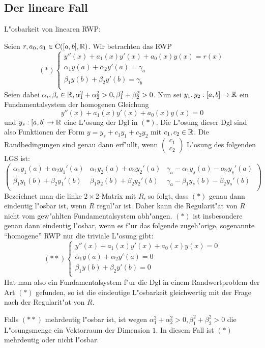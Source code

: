 \subsection{Der lineare Fall}
\deduction L"osbarkeit von linearen RWP:{
  Seien $r,a_0,a_1\in{\rm C}([a,b],\mathbb R)$. Wir betrachten das RWP
  \[(*)\left\{\begin{array}{l}
      y''(x)+a_1(x)y'(x)+a_0(x)y(x)=r(x)\\
      \alpha_1y(a)+\alpha_2y'(a)=\gamma_a\\
      \beta_1y(b)+\beta_2y'(b)=\gamma_b\\      
    \end{array}\right.
    \]
  Seien dabei $\alpha_i,\beta_i\in\mathbb R,\alpha_1^2+\alpha_2^2>0,
  \beta_1^2+\beta_2^2>0$. Nun sei $y_1,y_2:[a,b]\to\mathbb R$ ein 
  Fundamentalsystem der homogenen Gleichung
  \[y''(x)+a_1(x)y'(x)+a_0(x)y(x)=0
    \]
  und $y_s:[a,b]\to\mathbb R$ eine L"osung der Dgl in $(*)$. Die L"osung dieser
  Dgl sind also Funktionen der Form $y=y_s+c_1y_1+c_2y_2$ mit $c_1,c_2\in\mathbb R$.
  Die Randbedingungen sind genau dann erf"ullt, wenn 
  $\begin{pmatrix}c_1\\c_2\end{pmatrix}$ L"osung des folgenden LGS ist:
  \[\left(\begin{array}{ll|l}
      \alpha_1y_1(a)+\alpha_2y_1'(a) & \alpha_1 y_2(a)+\alpha_2y_2'(a) &
      \gamma_a-\alpha_1y_s(a)-\alpha_2y_s'(a)\\
      \beta_1y_1(b)+\beta_2y_1'(b) & \beta_1 y_2(b)+\beta_2y_2'(b) &
      \gamma_a-\beta_1y_s(b)-\beta_2y_s'(b)\\
      \end{array}\right)
    \]
  Bezeichnet man die linke $2\times 2$-Matrix mit $R$, so folgt, dass $(*)$
  genau dann eindeutig l"osbar ist, wenn $R$ regul"ar ist. Daher kann
  die Regularit"at von $R$ nicht vom gew"ahlten Fundamentalsystem abh"angen.
  $(*)$ ist insbesondere genau dann eindeutig l"osbar, wenn es f"ur das
  folgende zugeh"orige, sogenannte ``homogene'' RWP nur die triviale 
  L"osung gibt:
  \[(**)\left\{\begin{array}{l}
      y''(x)+a_1(x)y'(x)+a_0(x)y(x)=0\\
      \alpha_1y(a)+\alpha_2y'(a)=0\\
      \beta_1y(b)+\beta_2y'(b)=0\\      
    \end{array}\right.
    \]
  Hat man also ein Fundamentalsystem f"ur die Dgl in einem Randwertproblem
  der Art $(*)$ gefunden, so ist die eindeutige L"osbarkeit gleichwertig mit 
  der Frage nach der Regularit"at von $R$. 
  
  Falls $(**)$ mehrdeutig l"osbar ist, ist wegen $\alpha_1^2+\alpha_2^2>0,
  \beta_1^2+\beta_2^2>0$ die L"osungsmenge ein Vektorraum der Dimension $1$.
  In diesem Fall ist $(*)$ mehrdeutig oder nicht l"osbar.
  }
